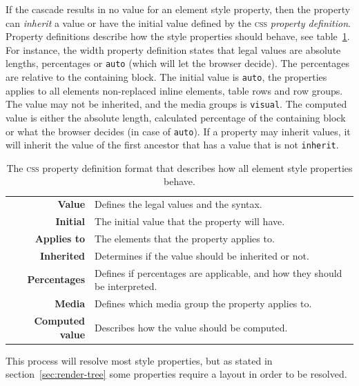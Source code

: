 \documentclass[a4paper,11pt]{kth-mag}
\newcommand{\code}[1]{\texttt{#1}}
\begin{document}
        If the cascade results in no value for an element style property, then the property can \emph{inherit} a value or have the initial value defined by the \textsc{css} \emph{property definition}.
        Property definitions describe how the style properties should behave, see table~\ref{table:css_property_definition}.
        For instance, the width property definition states that legal values are absolute lengths, percentages or \code{auto} (which will let the browser decide).
        The percentages are relative to the containing block.
        The initial value is \code{auto}, the properties applies to all elements non-replaced inline elements, table rows and row groups.
        The value may not be inherited, and the media groups is \code{visual}.
        The computed value is either the absolute length, calculated percentage of the containing block or what the browser decides (in case of \code{auto}).
        If a property may inherit values, it will inherit the value of the first ancestor that has a value that is not \code{inherit}.

        \begin{table}[ht]\center
          \tiny
          \begin{tabular}[t]{ r | l }
            \textbf{Value} & Defines the legal values and the syntax. \\
            \textbf{Initial} & The initial value that the property will have. \\
            \textbf{Applies to} & The elements that the property applies to. \\
            \textbf{Inherited} & Determines if the value should be inherited or not. \\
            \textbf{Percentages} & Defines if percentages are applicable, and how they should be interpreted. \\
            \textbf{Media} & Defines which media group the property applies to. \\
            \textbf{Computed value} & Describes how the value should be computed. \\
          \end{tabular}
          \caption{The \textsc{css} property definition format that describes how all element style properties behave.}
          \label{table:css_property_definition}
        \end{table}

        This process will resolve most style properties, but as stated in section~\ref{sec:render-tree} some properties require a layout in order to be resolved.
\end{document}
